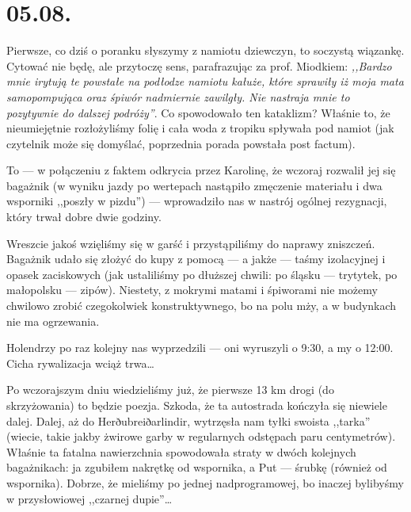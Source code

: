 \chapter*{05.08.}

Pierwsze, co dziś o poranku słyszymy z namiotu dziewczyn, to soczystą wiązankę. Cytować nie będę, ale przytoczę sens, parafrazując za prof. Miodkiem: \emph{,,Bardzo mnie irytują te powstałe na podłodze namiotu kałuże, które sprawiły iż moja mata samopompująca oraz śpiwór nadmiernie zawilgły. Nie nastraja mnie to pozytywnie do dalszej podróży''}. Co spowodowało ten kataklizm? Właśnie to, że nieumiejętnie rozłożyliśmy folię i cała woda z tropiku spływała pod namiot (jak czytelnik może się domyślać, poprzednia porada powstała post factum).

To --- w połączeniu z faktem odkrycia przez Karolinę, że wczoraj rozwalił jej się bagażnik (w wyniku jazdy po wertepach nastąpiło zmęczenie materiału i dwa wsporniki ,,poszły w pizdu'') --- wprowadziło nas w nastrój ogólnej rezygnacji, który trwał dobre dwie godziny.

Wreszcie jakoś wzięliśmy się w garść i przystąpiliśmy do naprawy zniszczeń. Bagażnik udało się złożyć do kupy z pomocą --- a jakże --- taśmy izolacyjnej i opasek zaciskowych (jak ustaliliśmy po dłuższej chwili: po śląsku --- trytytek, po małopolsku --- zipów). Niestety, z mokrymi matami i śpiworami nie możemy chwilowo zrobić czegokolwiek konstruktywnego, bo na polu mży, a w budynkach nie ma ogrzewania.

Holendrzy po raz kolejny nas wyprzedzili --- oni wyruszyli o 9:30, a my o 12:00. Cicha rywalizacja wciąż trwa…

Po wczorajszym dniu wiedzieliśmy już, że pierwsze 13 km drogi (do skrzyżowania) to będzie poezja. Szkoda, że ta autostrada kończyła się niewiele dalej. Dalej, aż do Herðubreiðarlindir, wytrzęsła nam tyłki swoista ,,tarka'' (wiecie, takie jakby żwirowe garby w regularnych odstępach paru centymetrów). Właśnie ta fatalna nawierzchnia spowodowała straty w dwóch kolejnych bagażnikach: ja zgubiłem nakrętkę od wspornika, a Put --- śrubkę (również od wspornika). Dobrze, że mieliśmy po jednej nadprogramowej, bo inaczej bylibyśmy w przysłowiowej ,,czarnej dupie''…



